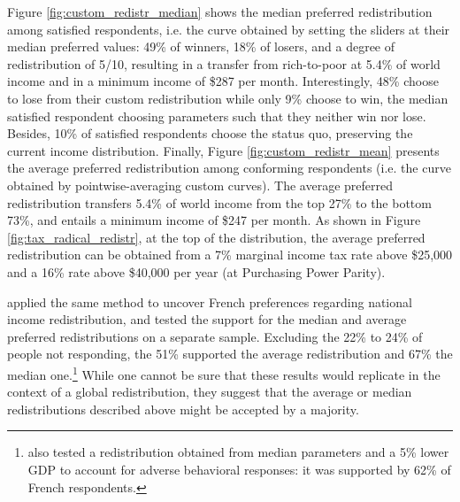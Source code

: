 \documentclass[12pt,english]{article}
\begin{document}
\begin{bibunit}

Figure \ref{fig:custom_redistr_median} shows the median preferred redistribution among satisfied respondents, i.e. the curve obtained by setting the sliders at their median preferred values: 49\% of winners, 18\% of losers, and a degree of redistribution of 5/10, resulting in a transfer from rich-to-poor at 5.4\% of world income and in a minimum income of \$287 per month. 
Interestingly, 48\% choose to lose from their custom redistribution while only 9\% choose to win, the median satisfied respondent choosing parameters such that they neither win nor lose. Besides, 10\% of satisfied respondents choose the status quo, preserving the current income distribution. 
Finally, Figure \ref{fig:custom_redistr_mean} presents the average preferred redistribution among conforming respondents (i.e. the curve obtained by pointwise-averaging custom curves). %
The average preferred redistribution transfers 5.4\% of world income %
from the top 27\% to the bottom 73\%, and entails a minimum income of \$247 per month.  %
As shown in Figure \ref{fig:tax_radical_redistr}, at the top of the distribution, the average preferred redistribution can be obtained from a 7\% marginal income tax rate above \$25,000 and a 16\% rate above \$40,000 per year (at Purchasing Power Parity). 

\cite{fabre_french_2022} applied the same method to uncover French preferences regarding national income redistribution, and tested the support for the median and average %
preferred redistributions on a separate sample. Excluding the 22\% to 24\% of people not responding, the 51\% supported the average redistribution and 67\% the median one.\footnote{\cite{fabre_french_2022} also tested a redistribution obtained from median parameters and a 5\% lower GDP to account for adverse behavioral responses: it was supported by 62\% of French respondents.} 
While one cannot be sure that these results would replicate in the context of a global redistribution, they suggest that the average or median redistributions described above might be accepted by a majority.


\end{bibunit}
\end{document}
